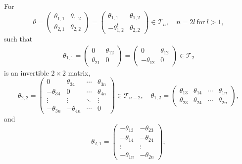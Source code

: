 \documentclass[9pt, BCOR=2mm]{amsart}
\numberwithin{equation}{section}
\numberwithin{equation}{section}
\begin{document}
For $$\theta=\left(\begin{matrix}
                 \theta_{1,1} &  \theta_{1,2} \\
               \theta_{2,1}& \theta_{2,2}
                 \end{matrix}\right)= \left(\begin{matrix}
               \theta_{1,1} & \theta_{1,2} \\
                -\theta_{1,2}^t &\theta_{2,2}
                 \end{matrix}\right)\in\mathcal{T}_n,\quad n=2l ~\text{for}~l>1, $$
                such that
                \begin{eqnarray}
  \theta_{1,1}=\left(\begin{matrix}
              0 &  \theta_{12} \\
               \theta_{21}& 0
                 \end{matrix}\right)=\left(\begin{matrix}
                 0 &  \theta_{12} \\
              - \theta_{12}& 0
                 \end{matrix}\right)\in\mathcal{T}_2\nonumber
\end{eqnarray} is an invertible $2\times2$ matrix,
                 $$\theta_{2,2}=\left(\begin{matrix}
                 0 &  \theta_{34}&\cdots&\theta_{3n} \\
              - \theta_{34}& 0&\cdots&\theta_{4n}\\
              \vdots&\vdots&\ddots&\vdots\\
              -\theta_{3n}&-\theta_{4n}&\cdots&0
                 \end{matrix}\right)\in\mathcal{T}_{n-2},\quad \theta_{1,2}=\left(\begin{matrix}
                \theta_{13} &  \theta_{14}&\cdots&\theta_{1n} \\
               \theta_{23}& \theta_{24}&\cdots&\theta_{2n}
                 \end{matrix}\right),$$
     and $$\theta_{2,1}=\left(\begin{matrix}
                -\theta_{13} & - \theta_{23} \\
                -\theta_{14} & - \theta_{24} \\
                \vdots&\vdots\\
             -\theta_{1n}& -\theta_{2n}
                 \end{matrix}\right);$$
\end{document}
